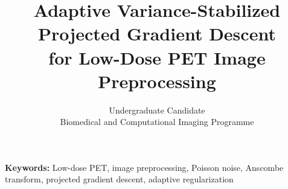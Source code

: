 \documentclass[12pt,a4paper]{article}
\title{\textbf{Adaptive Variance-Stabilized Projected Gradient Descent\\
for Low-Dose PET Image Preprocessing}}
\author{Undergraduate Candidate\\
Biomedical and Computational Imaging Programme}
\date{}
\begin{document}
\maketitle
\begin{abstract}
\normalsize

\end{abstract}
\noindent\textbf{Keywords:} Low-dose PET, image preprocessing, Poisson noise,
Anscombe transform, projected gradient descent, adaptive regularization
\vspace{1em}








\end{document}
